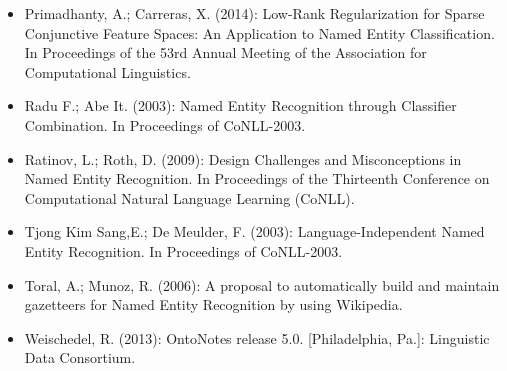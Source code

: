 \documentclass{beamer}
\begin{document}
\begin{frame}
\begin{itemize}
						
						\item Primadhanty, A.; Carreras, X. (2014): Low-Rank Regularization for Sparse Conjunctive Feature Spaces:
						An Application to Named Entity Classification. In Proceedings of the 53rd Annual Meeting of the Association for Computational Linguistics.
		\end{itemize}
	\end{frame}
	\begin{frame}
		\begin{itemize}
			\tiny
				\item Radu F.; Abe It. (2003):  Named Entity Recognition
				through Classifier Combination. In
				Proceedings of 	CoNLL-2003.\\
				\item Ratinov, L.; Roth, D. (2009): Design Challenges and Misconceptions in Named Entity Recognition. In Proceedings of the Thirteenth Conference on Computational Natural Language Learning (CoNLL).
				\item Tjong Kim Sang,E.; De Meulder, F. (2003): Language-Independent Named Entity Recognition. In
				Proceedings of 	CoNLL-2003.\\
				\item Toral, A.; Munoz, R. (2006): A proposal to automatically build and maintain gazetteers for Named Entity Recognition by using Wikipedia.\\
				\item Weischedel, R. (2013): OntoNotes release 5.0. [Philadelphia, Pa.]: Linguistic Data Consortium.\\
		\end{itemize}
	\end{frame}
\end{document}
